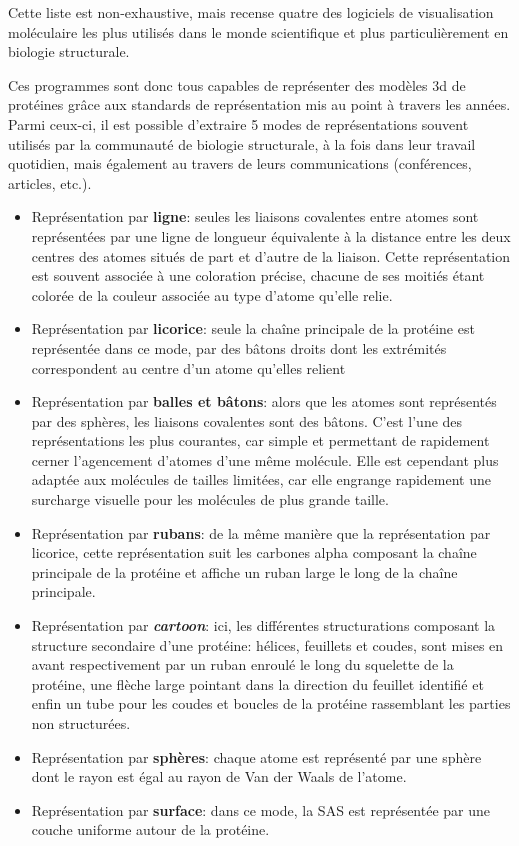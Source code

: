 Cette liste est non-exhaustive, mais recense quatre des logiciels de visualisation moléculaire les plus utilisés dans le monde scientifique et plus particulièrement en biologie structurale.

Ces programmes sont donc tous capables de représenter des modèles 3d de protéines grâce aux standards de représentation mis au point à travers les années. Parmi ceux-ci, il est possible d'extraire 5 modes de représentations souvent utilisés par la communauté de biologie structurale, à la fois dans leur travail quotidien, mais également au travers de leurs communications (conférences, articles, etc.).

\begin{itemize}
  \item Représentation par \textbf{ligne}: seules les liaisons covalentes entre atomes sont représentées par une ligne de longueur équivalente à la distance entre les deux centres des atomes situés de part et d'autre de la liaison. Cette représentation est souvent associée à une coloration précise, chacune de ses moitiés étant colorée de la couleur associée au type d'atome qu'elle relie.
  \item Représentation par \textbf{licorice}: seule la chaîne principale de la protéine est représentée dans ce mode, par des bâtons droits dont les extrémités correspondent au centre d'un atome qu'elles relient
  \item Représentation par \textbf{balles et bâtons}: alors que les atomes sont représentés par des sphères, les liaisons covalentes sont des bâtons. C'est l'une des représentations les plus courantes, car simple et permettant de rapidement cerner l'agencement d'atomes d'une même molécule. Elle est cependant plus adaptée aux molécules de tailles limitées, car elle engrange rapidement une surcharge visuelle pour les molécules de plus grande taille.
  \item Représentation par \textbf{rubans}: de la même manière que la représentation par licorice, cette représentation suit les carbones alpha composant la chaîne principale de la protéine et affiche un ruban large le long de la chaîne principale.
  \item Représentation par \textit{\textbf{cartoon}}: ici, les différentes structurations composant la structure secondaire d'une protéine: hélices, feuillets et coudes, sont mises en avant respectivement par un ruban enroulé le long du squelette de la protéine, une flèche large pointant dans la direction du feuillet identifié et enfin un tube pour les coudes et boucles de la protéine rassemblant les parties non structurées.
  \item Représentation par \textbf{sphères}: chaque atome est représenté par une sphère dont le rayon est égal au rayon de Van der Waals de l'atome.
  \item Représentation par \textbf{surface}: dans ce mode, la SAS est représentée par une couche uniforme autour de la protéine.
\end{itemize}


